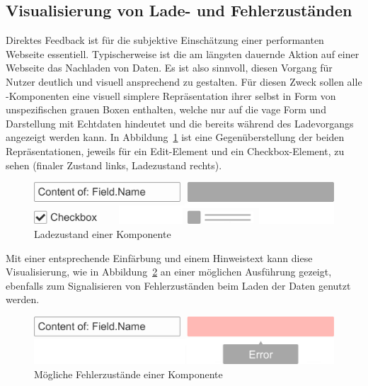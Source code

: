 \subsection{Visualisierung von Lade- und Fehlerzuständen}\label{subsec:loading_state_section}
Direktes Feedback ist für die subjektive Einschätzung einer performanten Webseite essentiell. Typischerweise ist die am längsten dauernde Aktion auf einer Webseite das Nachladen von Daten. Es ist also sinnvoll, diesen Vorgang für Nutzer deutlich und visuell ansprechend zu gestalten. Für diesen Zweck sollen alle -Komponenten eine visuell simplere Repräsentation ihrer selbst in Form von unspezifischen grauen Boxen enthalten, welche nur auf die vage Form und Darstellung mit Echtdaten hindeutet und die bereits während des Ladevorgangs angezeigt werden kann. In Abbildung~\ref{fig:comp_loading_final_comparison} ist eine Gegenüberstellung der beiden Repräsentationen, jeweils für ein Edit-Element und ein Checkbox-Element, zu sehen (finaler Zustand links, Ladezustand rechts).

\begin{figure}
    \centering
    \captionsetup{justification=centering}
    \includegraphics[width=\textwidth]{figures/comp_loading_final_comparison.png}
        \caption{Ladezustand einer Komponente}\label{fig:comp_loading_final_comparison}
\end{figure}

Mit einer entsprechende Einfärbung und einem Hinweistext kann diese Visualisierung, wie in Abbildung~\ref{fig:comp_possible_error_state} an einer möglichen Ausführung gezeigt, ebenfalls zum Signalisieren von Fehlerzuständen beim Laden der Daten genutzt werden.

\begin{figure}
    \centering
    \captionsetup{justification=centering}
    \includegraphics[width=\textwidth]{figures/comp_possible_error_state.png}
        \caption{Mögliche Fehlerzustände einer Komponente}\label{fig:comp_possible_error_state}
\end{figure}

